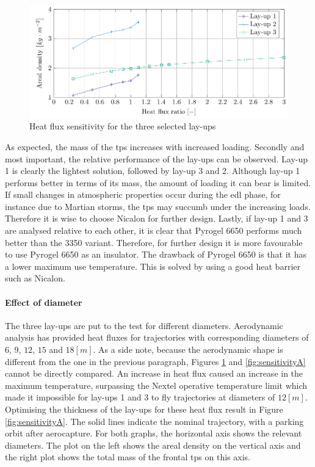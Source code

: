 \begin{figure}[h]
	\centering
	\includegraphics{./Figure/Thermal/Sensitivityq.pdf}
	\caption{Heat flux sensitivity for the three selected lay-ups}
	\label{fig:sensitivityq}
\end{figure}


As expected, the mass of the \gls{tps} increases with increased loading. Secondly and most important, the relative performance of the lay-ups can be observed. Lay-up 1 is clearly the lightest solution, followed by lay-up 3 and 2. Although lay-up 1 performs better in terms of its mass, the amount of loading it can bear is limited. If small changes in atmospheric properties occur during the \gls{edl} phase, for instance due to Martian storms, the \gls{tps} may succumb under the increasing loads. Therefore it is wise to choose Nicalon for further design. Lastly, if lay-up 1 and 3 are analysed relative to each other, it is clear that Pyrogel 6650 performs much better than the 3350 variant. Therefore, for further design it is more favourable to use Pyrogel 6650 as an insulator. The drawback of Pyrogel 6650 is that it has a lower maximum use temperature. This is solved by using a good heat barrier such as Nicalon.

\paragraph{Effect of diameter}
The three lay-ups are put to the test for different diameters. Aerodynamic analysis has provided heat fluxes for trajectories with corresponding diameters of $6$, $9$, $12$, $15$ and $18 \left[ m \right]$. As a side note, because the aerodynamic shape is different from the one in the previous paragraph, Figures \ref{fig:sensitivityq} and \ref{fig:sensitivityA} cannot be directly compared. An increase in heat flux caused an increase in the maximum temperature, surpassing the Nextel operative temperature limit which made it impossible for lay-ups 1 and 3 to fly trajectories at diameters of $12 \left[ m \right]$. Optimising the thickness of the lay-ups for these heat flux result in Figure \ref{fig:sensitivityA}. The solid lines indicate the nominal trajectory, with a parking orbit after aerocapture. For both graphs, the horizontal axis shows the relevant diameters. The plot on the left shows the areal density on the vertical axis and the right plot shows the total mass of the frontal \gls{tps} on this axis.

